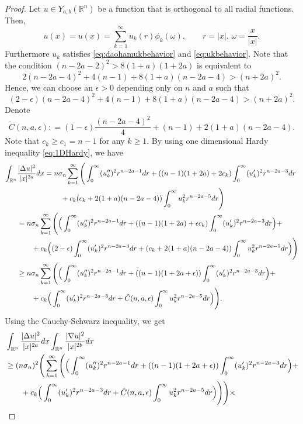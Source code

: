 \documentclass[10pt,a4paper]{amsart}
\def\R{\mathbb R}%
\def\irn{\int_{\R^n}}
\begin{document}
\begin{proof}
Let $u\in Y_{a,b}(\R^n)$ be a function that is orthogonal to all radial functions. Then, 
\[
u(x) = u(x) = \sum_{k=1}^\infty u_k(r) \phi_k(\omega),\qquad r = |x|, \,\omega = \frac x{|x|}.
\]
Furthermore $u_k$ satisfies \eqref{eq:daohamukbehavior} and \eqref{eq:ukbehavior}. Note that the condition $(n-2a -2)^2 > 8(1+a)(1+2a)$ is equivalent to
\[
2(n-2a-4)^2 + 4(n-1) + 8(1+a)(n-2a -4) > (n+2a)^2.
\]
Hence, we can choose an $\epsilon >0$ depending only on $n$ and $a$ such that
\begin{equation}\label{eq:chooseep}
(2-\epsilon)(n-2a-4)^2 + 4(n-1) + 8(1+a)(n-2a -4) > (n+2a)^2.
\end{equation}
Denote
\[
 \tilde{C}(n,a,\epsilon) : = (1-\epsilon)\frac{(n-2a-4)^2}4 + (n-1) + 2(1+a)(n-2a -4).
\]
Note that $c_k \geq c_1 = n-1$ for any $k\geq 1$. By using one dimensional Hardy inequality \eqref{eq:1DHardy}, we have
\begin{align*}
\irn &\frac{|\Delta u|^2}{|x|^{2a}} dx =n\sigma_n \sum_{k=1}^\infty\Bigg(\int_0^\infty (u_k'')^2 r^{n-2a -1} dr + ((n-1)(1+2a) +2c_k) \int_0^\infty (u_k')^2 r^{n-2a -3} dr\notag\\
&\qquad\qquad\qquad + c_k(c_k + 2(1+a)(n-2a -4))\int_0^\infty u_k^2 r^{n -2a -5} dr\Bigg)\\
&=n\sigma_n \sum_{k=1}^\infty\Bigg(\Big(\int_0^\infty (u_k'')^2 r^{n-2a -1} dr + ((n-1)(1+2a) +\epsilon c_k)\int_0^\infty (u_k')^2 r^{n-2a -3} dr\Big) +\notag\\
&\qquad +c_k\Big((2-\epsilon) \int_0^\infty (u_k')^2 r^{n-2a -3} dr + (c_k + 2(1+a)(n-2a -4))\int_0^\infty u_k^2 r^{n -2a -5} dr\Big)\Bigg)\notag\\
&\geq n\sigma_n \sum_{k=1}^\infty\Bigg(\Big(\int_0^\infty (u_k'')^2 r^{n-2a -1} dr + ((n-1)(1+2a+\epsilon))\int_0^\infty (u_k')^2 r^{n-2a -3} dr\Big) +\notag\\
&\qquad +c_k\Big(\int_0^\infty (u_k')^2 r^{n-2a -3} dr + \tilde C(n,a,\epsilon)\int_0^\infty u_k^2 r^{n -2a -5} dr\Big)\Bigg).
\end{align*}
Using  the Cauchy-Schwarz inequality, we get
\begin{align}\label{eq:decompose2ndCKN1}
&\irn \frac{|\Delta u|^2}{|x|^{2a}} dx \irn \frac{|\nabla u|^2}{|x|^{2b}} dx\notag\\
&\geq (n\sigma_n)^2 \Bigg(\sum_{k=1}^\infty\Bigg(\Big(\int_0^\infty (u_k'')^2 r^{n-2a -1} dr + ((n-1)(1+2a+\epsilon))\int_0^\infty (u_k')^2 r^{n-2a -3} dr\Big) +\notag\\
&\qquad +c_k\Big(\int_0^\infty (u_k')^2 r^{n-2a -3} dr +  \tilde{C}(n,a,\epsilon)\int_0^\infty u_k^2 r^{n -2a -5} dr\Big)\Bigg)\Bigg)\times\notag\\

\end{align}
\end{proof}
\end{document}
